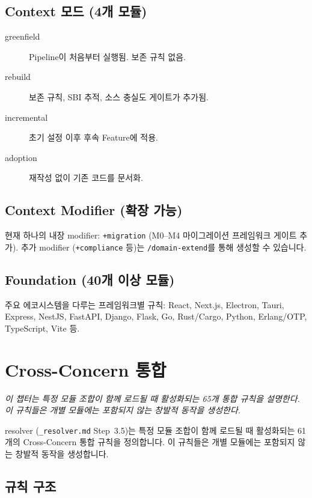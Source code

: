 \documentclass[11pt,a4paper,openright,twoside]{report}
\newcommand{\cmd}[1]{\texttt{/#1}}
\newcommand{\file}[1]{\texttt{#1}}
\begin{document}
\section{Context 모드 (4개 모듈)}

\begin{description}
  \item[greenfield] Pipeline이 처음부터 실행됨. 보존 규칙 없음.
  \item[rebuild] 보존 규칙, SBI 추적, 소스 충실도 게이트가 추가됨.
  \item[incremental] 초기 설정 이후 후속 Feature에 적용.
  \item[adoption] 재작성 없이 기존 코드를 문서화.
\end{description}

\section{Context Modifier (확장 가능)}

현재 하나의 내장 modifier: \texttt{+migration} (M0--M4 마이그레이션 프레임워크 게이트 추가). 추가 modifier (\texttt{+compliance} 등)는 \cmd{domain-extend}를 통해 생성할 수 있습니다.

\section{Foundation (40개 이상 모듈)}

주요 에코시스템을 다루는 프레임워크별 규칙: React, Next.js, Electron, Tauri, Express, NestJS, FastAPI, Django, Flask, Go, Rust/Cargo, Python, Erlang/OTP, TypeScript, Vite 등.


\chapter{Cross-Concern 통합}
\label{ch:cross-concern}

\textit{이 챕터는 특정 모듈 조합이 함께 로드될 때 활성화되는 65개 통합 규칙을 설명한다. 이 규칙들은 개별 모듈에는 포함되지 않는 창발적 동작을 생성한다.}

resolver (\file{\_resolver.md} Step~3.5)는 특정 모듈 조합이 함께 로드될 때 활성화되는 61개의 Cross-Concern 통합 규칙을 정의합니다. 이 규칙들은 개별 모듈에는 포함되지 않는 창발적 동작을 생성합니다.

\section{규칙 구조}
\end{document}
